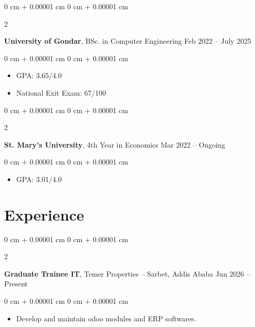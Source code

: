 \documentclass[10pt, letterpaper]{article}
\newenvironment{highlights}{
    \begin{itemize}[
        topsep=0.10 cm,
        parsep=0.10 cm,
        partopsep=0pt,
        itemsep=0pt,
        leftmargin=0 cm + 10pt
    ]
}{
    \end{itemize}
} %
\newenvironment{onecolentry}{
    \begin{adjustwidth}{
        0 cm + 0.00001 cm
    }{
        0 cm + 0.00001 cm
    }
}{
    \end{adjustwidth}
} %
\newenvironment{twocolentry}[2][]{
    \onecolentry
    \def\secondColumn{#2}
    \setcolumnwidth{\fill, 4.5 cm}
    \begin{paracol}{2}
}{
    \switchcolumn \raggedleft \secondColumn
    \end{paracol}
    \endonecolentry
} %
\begin{document}
        \begin{twocolentry}{
            Feb 2022 – July 2025
        }
            \textbf{University of Gondar}, BSc. in Computer Engineering\end{twocolentry}

        \vspace{0.10 cm}
        \begin{onecolentry}
            \begin{highlights}
                \item GPA: 3.65/4.0
                \item National Exit Exam: 67/100
            \end{highlights}
        \end{onecolentry}
        \vspace{0.20 cm}

                \begin{twocolentry}{
            Mar 2022 – Ongoing
        }
            \textbf{St. Mary's University}, 4th Year in Economics\end{twocolentry}

        \vspace{0.10 cm}
        \begin{onecolentry}
            \begin{highlights}
                \item GPA: 3.01/4.0
            \end{highlights}
        \end{onecolentry}

    
    \section{Experience}
            \begin{twocolentry}{
            Jun 2026 – Present
        }
            \textbf{Graduate Trainee IT}, Temer Properties -- Sarbet, Addis Ababa\end{twocolentry}

        \vspace{0.10 cm}
        \begin{onecolentry}
            \begin{highlights}
                \item Develop and maintain odoo modules and ERP softwares.
            \end{highlights}
       \end{onecolentry} 
\end{document}
